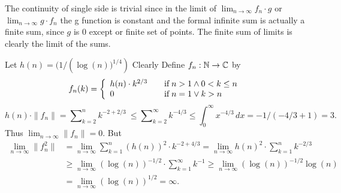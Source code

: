 \begin{enumerate}
The continuity of single side is trivial
since in the limit of
\(\lim_{n\to\infty} f_n\cdot g\)
or
\(\lim_{n\to\infty} g\cdot f_n\)
the g function is constant
and the formal infinite sum is actually a finite sum,
since $g$ is $0$ except or finite set of points.
The finite sum of limits is clearly the limit of the sums.

Let \(h(n) = (1/\left(\log(n))^{1/4}\right)\)
Clearly
Define \(f_n : \mathbb{N} \to \mathbb{C}\) by
\begin{equation*}
f_n(k) = \left\{
\begin{array}{ll}
h(n)\cdot k^{2/3} & \quad \textnormal{if}\; n > 1 \land 0 < k \leq n \\
0 & \quad \textnormal{if}\; n = 1 \lor k > n 
\end{array}\right.
\end{equation*}
\begin{equation*}
h(n)\cdot\|f_n\|
  = \sum\nolimits_{k=2}^n k^{-2+2/3}\
  \leq \sum\nolimits_{k=2}^\infty k^{-4/3}
  \leq \int\nolimits_0^\infty x^{-4/3}\,dx
  = -1/(-4/3 + 1) = 3.
\end{equation*}
Thus \(\lim_{n\to\infty} \|f_n\| = 0\).
But
\begin{align*}
\lim_{n\to\infty} \|f_n^2\|
 &= \lim_{n\to\infty} \sum\nolimits_{k=1}^n (h(n))^2\cdot k^{-2+4/3}
   = \lim_{n\to\infty} h(n)^2\cdot \sum\nolimits_{k=1}^n k^{-2/3} \\
 & \geq \lim_{n\to\infty} \left(\log(n)\right)^{-1/2}
     \cdot  \sum\nolimits_{k=1}^\infty k^{-1}
   \geq \lim_{n\to\infty} \left(\log(n)\right)^{-1/2} \log(n) \\
 &= \lim_{n\to\infty} \left(\log(n)\right)^{1/2} = \infty.
\end{align*}

\begin{excopy}
\end{excopy}

\unfinished

\end{enumerate}
